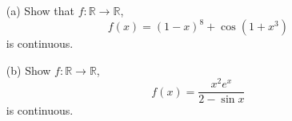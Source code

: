 \documentclass[openany]{book}
\newcommand{\R}{\mathbb{R}}
\begin{document}


\begin{prob}
    \begin{enumerate}
        \item[(a)] Show that $f:\R\to\R$,
        \begin{equation*}
            f(x)=(1-x)^8+\cos(1+x^3)
        \end{equation*}
        is continuous.
        \item[(b)] Show $f:\R\to\R$, 
        \begin{equation*}
            f(x)=\frac{x^2e^x}{2-\sin x}
        \end{equation*}
        is continuous.
    \end{enumerate}
\end{prob}
\end{document}
